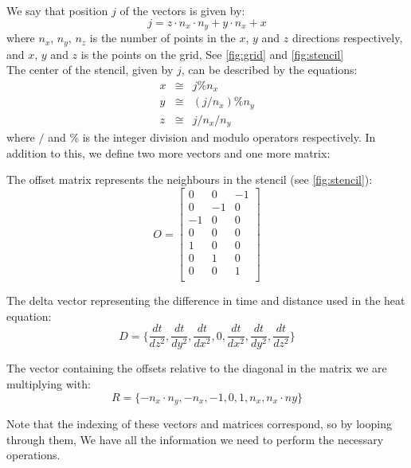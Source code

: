 We say that position $j$ of the vectors is given by:
\begin{equation}
j = z\cdot n_x\cdot n_y + y\cdot n_x + x
\end{equation}
where $n_x$, $n_y$, $n_z$ is the number of points in the $x$, $y$ and $z$ directions
respectively, and $x$, $y$ and $z$ is the points on the grid, See \cref{fig:grid} and
\cref{fig:stencil} \\

The center of the stencil, given by $j$, can be described by the equations:
\begin{eqnarray}
  x & \cong & j\%n_x \\
  y & \cong & (j/n_x)\%n_y \\
  z & \cong & j/n_x/n_y 
\end{eqnarray}
where $/$ and $ \% $ is the integer division and modulo operators respectively.
In addition to this, we define two more vectors and one more matrix:

The offset matrix represents the neighbours in the stencil (see \cref{fig:stencil}):
\begin{equation}
O =
\left[
\begin{array}{ccc}
0 & 0 & -1 \\
0 & -1 & 0 \\
-1 & 0 & 0 \\
0 & 0 & 0 \\
1 & 0 & 0 \\
0 & 1 & 0 \\
0 & 0 & 1 \\
\end{array}
\right]
\end{equation}

The delta vector representing the difference in time and distance used in the heat
equation:
\begin{equation}
D = \{ \frac{dt}{dz^2}, \frac{dt}{dy^2}, \frac{dt}{dx^2}, 0, \frac{dt}{dx^2}, \frac{dt}{dy^2}, \frac{dt}{dz^2} \}
\end{equation}

The vector containing the offsets relative to the diagonal in the matrix we are multiplying
with:
\begin{equation}
R = \{ -n_x\cdot n_y, -n_x, -1, 0, 1, n_x, n_x\cdot ny \}
\end{equation}

Note that the indexing of these vectors and matrices correspond, so by looping through them,
We have all the information we need to perform the necessary operations.

